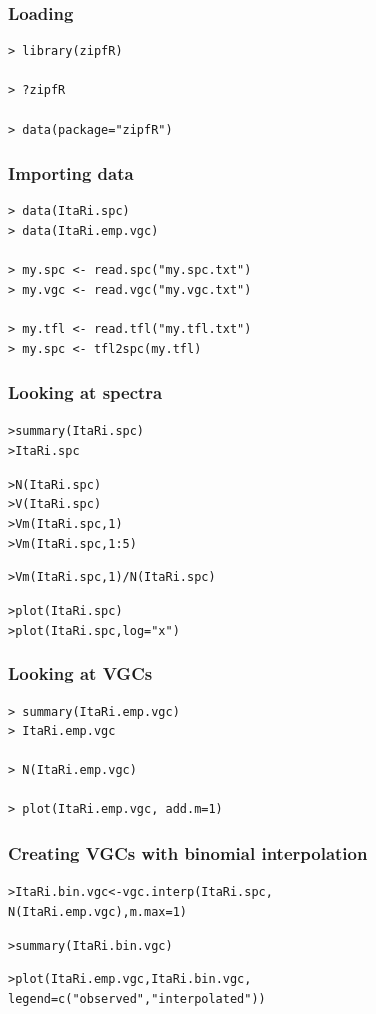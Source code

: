 \documentclass[handout,notes=show,t]{beamer} %
\begin{document}
\begin{frame}[fragile]
  \frametitle{Loading}

\begin{verbatim}
> library(zipfR)

> ?zipfR

> data(package="zipfR")
\end{verbatim}

\end{frame}


\begin{frame}[fragile]
  \frametitle{Importing data}

\begin{verbatim}
> data(ItaRi.spc)
> data(ItaRi.emp.vgc)

> my.spc <- read.spc("my.spc.txt")
> my.vgc <- read.vgc("my.vgc.txt")

> my.tfl <- read.tfl("my.tfl.txt")
> my.spc <- tfl2spc(my.tfl)
\end{verbatim}

\end{frame}

\begin{frame}[fragile]
  \frametitle{Looking at spectra}

\begin{alltt}
> summary(ItaRi.spc)
> ItaRi.spc

> N(ItaRi.spc)
> V(ItaRi.spc)
> Vm(ItaRi.spc,1)
> Vm(ItaRi.spc,1:5)

> Vm(ItaRi.spc,1) / N(ItaRi.spc)

> plot(ItaRi.spc)
> plot(ItaRi.spc, log="x")
\end{alltt}
\end{frame}

\begin{frame}[fragile]
  \frametitle{Looking at VGCs}

\begin{verbatim}
> summary(ItaRi.emp.vgc)
> ItaRi.emp.vgc

> N(ItaRi.emp.vgc)

> plot(ItaRi.emp.vgc, add.m=1)
\end{verbatim}
\end{frame}

\begin{frame}[fragile]
  \frametitle{Creating VGCs with binomial interpolation}

\begin{alltt}

> ItaRi.bin.vgc <- vgc.interp(ItaRi.spc,
  N(ItaRi.emp.vgc), m.max=1)

> summary(ItaRi.bin.vgc)


> plot(ItaRi.emp.vgc, ItaRi.bin.vgc,
  legend=c("observed","interpolated"))
\end{alltt}


\end{frame}
\end{document}
